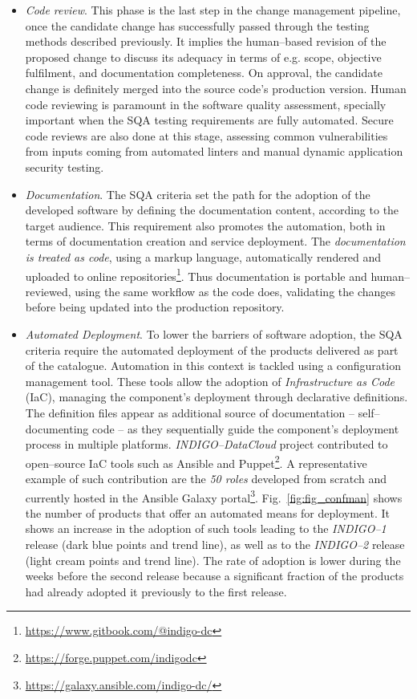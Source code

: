 \documentclass[journal]{IEEEtran}
\begin{document}
\begin{itemize}
\item \textit{Code review}.
This phase is the last step in the change management pipeline, once the candidate change has
successfully passed through the testing methods described previously. It implies the human--based
revision of the proposed change to discuss its adequacy in terms of e.g. scope, objective fulfilment,
and documentation completeness. On approval, the candidate change is definitely merged into
the source code's production version. Human code reviewing is paramount in the software quality assessment, specially
important when the SQA testing requirements are fully automated. Secure code reviews are also
done at this stage, assessing common vulnerabilities from inputs coming from automated linters
and manual dynamic application security testing.

\item \textit{Documentation}.
The SQA criteria set the path for the adoption of the developed software by
defining the documentation content, according to the target audience. This requirement also
promotes the automation, both in terms of documentation creation and service deployment. The
\textit{documentation is treated as code}, using a markup language, automatically rendered and
uploaded to online repositories\footnote{\url{https://www.gitbook.com/@indigo-dc}}.
Thus documentation is portable and
human--reviewed, using the same workflow as the code does, validating the changes before being
updated into the production repository.

\item \textit{Automated Deployment}.
To lower the barriers of software adoption, the SQA criteria require the automated
deployment of the products delivered as part of the catalogue. Automation in this context is
tackled using a configuration management tool. These tools allow the adoption of
\textit{Infrastructure as Code} (IaC), managing the component's deployment through declarative
definitions. The definition files appear as additional source of documentation
-- self--documenting code -- as they sequentially guide the component's deployment process in multiple
platforms. {\sl INDIGO--DataCloud} project contributed to open--source IaC tools such
as Ansible
and Puppet\footnote{\url{https://forge.puppet.com/indigodc}}. A representative example of
such contribution are the \textit{50 roles} developed from scratch and currently hosted in
the Ansible Galaxy portal\footnote{\url{https://galaxy.ansible.com/indigo-dc/}}. Fig.~\ref{fig:fig_confman}
shows the number of products that offer an automated means for deployment.
It shows an increase in the adoption of such tools leading to the {\sl INDIGO--1} release
(dark blue points and trend line), as well as to the {\sl INDIGO--2} release
(light cream points and trend line). The rate of adoption is lower during the weeks
before the second release because a significant fraction of the products had already adopted it
previously to the first release.
\end{itemize}
\end{document}
